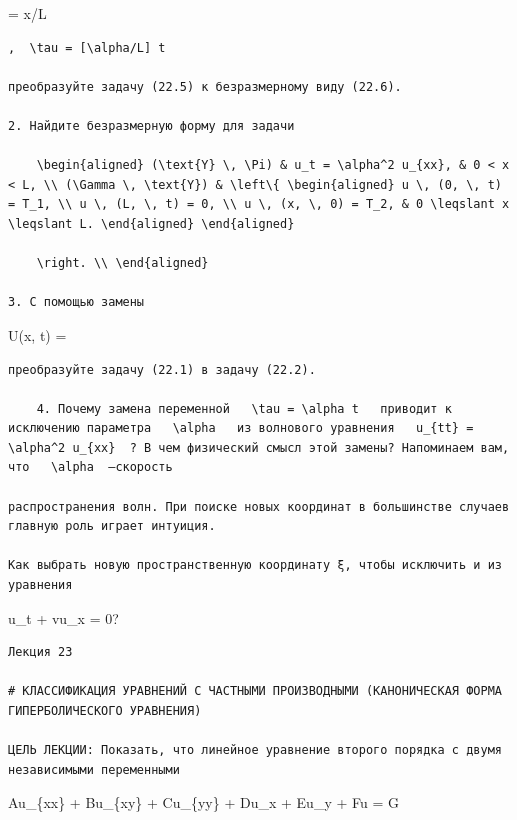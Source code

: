 \documentclass[
  ukrainian,
]{article}
\begin{document}
\xi = x/L

\begin{verbatim}
,  \tau = [\alpha/L] t 

преобразуйте задачу (22.5) к безразмерному виду (22.6).

2. Найдите безразмерную форму для задачи

    \begin{aligned} (\text{Y} \, \Pi) & u_t = \alpha^2 u_{xx}, & 0 < x < L, \\ (\Gamma \, \text{Y}) & \left\{ \begin{aligned} u \, (0, \, t) = T_1, \\ u \, (L, \, t) = 0, \\ u \, (x, \, 0) = T_2, & 0 \leqslant x \leqslant L. \end{aligned} \end{aligned}

    \right. \\ \end{aligned}

3. С помощью замены
\end{verbatim}

U(x, t) = 

\begin{verbatim}
преобразуйте задачу (22.1) в задачу (22.2).

    4. Почему замена переменной   \tau = \alpha t   приводит к исключению параметра   \alpha   из волнового уравнения   u_{tt} = \alpha^2 u_{xx}  ? В чем физический смысл этой замены? Напоминаем вам, что   \alpha  —скорость

распространения волн. При поиске новых координат в большинстве случаев главную роль играет интуиция.

Как выбрать новую пространственную координату ξ, чтобы исключить и из уравнения
\end{verbatim}

u\_t + vu\_x = 0?

\begin{verbatim}
Лекция 23

# КЛАССИФИКАЦИЯ УРАВНЕНИЙ С ЧАСТНЫМИ ПРОИЗВОДНЫМИ (КАНОНИЧЕСКАЯ ФОРМА ГИПЕРБОЛИЧЕСКОГО УРАВНЕНИЯ)

ЦЕЛЬ ЛЕКЦИИ: Показать, что линейное уравнение второго порядка с двумя независимыми переменными
\end{verbatim}

Au\_\{xx\} + Bu\_\{xy\} + Cu\_\{yy\} + Du\_x + Eu\_y + Fu = G
\end{document}
